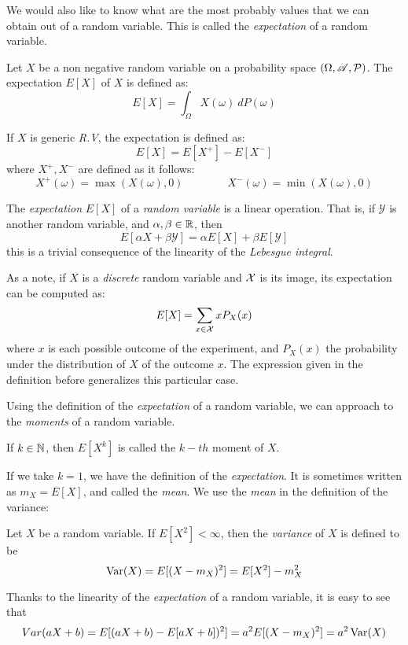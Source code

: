 We would also like to know what are the most probably values that we can obtain out of a random variable.  This is called the \emph{expectation} of a random variable.

\begin{ndef}
Let $X$ be a non negative random variable on a probability space $(\Omega,\mathscr{A},\mathcal{P})$. The expectation $E[X]$ of $X$ is defined as:
$$
E[X] = \int_\Omega X(\omega) \ dP(\omega)
$$
\end{ndef}
If $X$ is generic \emph{R.V}, the expectation is defined as:
$$
E[X] = E[X^+] - E[X^-]
$$
where $X^+,X^-$ are defined as it follows:
$$
X^+(\omega) = \max(X(\omega),0) \quad \quad  \quad \quad X^-(\omega) = \min(X(\omega),0)
$$

The \emph{expectation} $E[X]$ of a \emph{random variable} is a linear operation. That is, if $\mathcal Y$ is another random variable, and $\alpha,\beta \in \mathbb{R}$, then
$$
E[\alpha X + \beta \mathcal Y] = \alpha E[X] + \beta E[\mathcal Y]
$$
this is a trivial consequence of the linearity of the \emph{Lebesgue integral}.

As a note, if $X$ is a \emph{discrete} random variable and $\mathcal{X}$ is its image, its expectation can be computed as:
$$
E[X] = \sum_{x \in \mathcal{X}} x  P_X(x)
$$
where $x$ is each possible outcome of the experiment, and $P_X(x)$ the probability under the distribution of $X$ of the outcome $x$. The expression given in the definition before generalizes this particular case.

Using the definition of the \emph{expectation} of a random variable, we can approach to the \emph{moments} of a random variable.

\begin{ndef}
If $k \in \mathbb N$, then $E[X^k]$ is called the $k-th$ moment of $X$.
\end{ndef}
If we take $k = 1$, we have the definition of the \emph{expectation}. It is sometimes written as $m_X = E[X]$, and called the \emph{mean}. We use the \emph{mean} in the definition of the variance:

\begin{ndef}
Let $X$ be a random variable. If $E[X^2] < \infty$, then the \emph{variance} of $X$ is defined to be
$$
\operatorname*{Var}(X) = E[(X - m_X)^2] = E[X^2] - m_X^2 
$$
\end{ndef}

Thanks to the linearity of the \emph{expectation} of a random variable, it is easy to see that
$$
Var(aX + b) = E[(aX + b) - E[aX + b])^2] = a^2E[(X - m_X)^2] = a^2 \operatorname*{Var}(X)
$$

